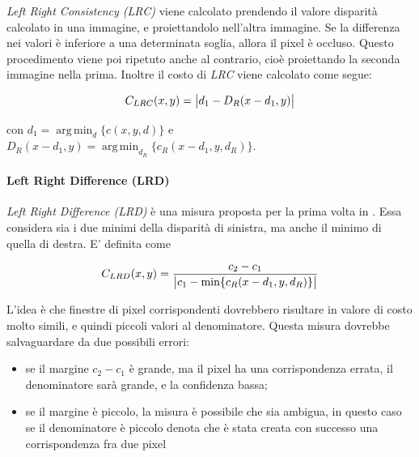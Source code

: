 \documentclass[12pt]{report}
\DeclarePairedDelimiter{\abs}{\lvert}{\rvert}    %
\DeclareMathOperator*{\argmin}{arg\,min} %
\begin{document}
				\textit{Left Right Consistency (LRC)} viene calcolato prendendo il valore disparità calcolato in una immagine, e proiettandolo nell'altra immagine. Se la differenza nei valori è inferiore a una determinata soglia, allora il pixel è occluso. Questo procedimento viene poi ripetuto anche al contrario, cioè proiettando la seconda immagine nella prima. Inoltre il costo di \textit{LRC} viene calcolato come segue:
				
				\begin{equation}
					C_{LRC}(x,y)=\abs[\big]{d_{1}-D_{R}(x-d_{1},y)}
					\label{eq:LRC}
				\end{equation}	
				
				\noindent con $d_{1}=\argmin_{d}\bigr\{c(x,y,d)\bigr\}$ e $D_{R}(x-d_{1},y)=\argmin_{d_{R}}\bigr\{c_{R}(x-d_{1},y,d_{R})\bigr\}$.
				
			\paragraph{Left Right Difference (LRD)}	
			\label{par:LRD}
			
				\textit{Left Right Difference (LRD)} è una misura proposta per la prima volta in \cite{mordohai_pami}. Essa considera sia i due minimi della disparità di sinistra, ma anche il minimo di quella di destra. E' definita come
				
				\begin{equation}
					C_{LRD}(x,y)=\frac{c_{2}-c_{1}}{\abs[\big]{c_{1}-\min\{c_{R}(x-d_{1},y,d_{R})\}}}
					\label{eq:LRD}
				\end{equation}
				
				\noindent L'idea è che finestre di pixel corrispondenti dovrebbero risultare in valore di costo molto simili, e quindi piccoli valori al denominatore. Questa misura dovrebbe salvaguardare da due possibili errori:
				
				\begin{itemize}
					\item se il margine $c_{2}-c_{1}$ è grande, ma il pixel ha una corrispondenza errata, il denominatore sarà grande, e la confidenza bassa;
					
					\item se il margine è piccolo, la misura è possibile che sia ambigua, in questo caso se il denominatore è piccolo denota che è stata creata con successo una corrispondenza fra due pixel
					
				\label{item:LRD}	
				\end{itemize}			
				
\end{document}
